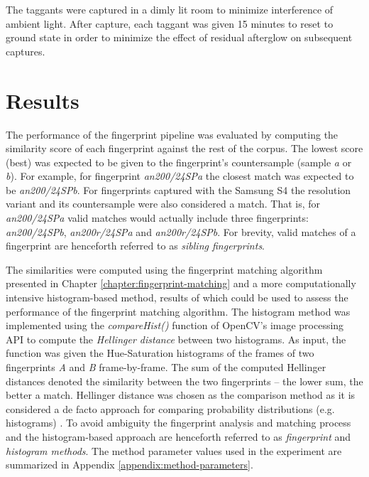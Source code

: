 \documentclass[thesis.tex]{subfiles}
\begin{document}
The taggants were captured in a dimly lit room to minimize interference of ambient light. After capture, each taggant was given 15 minutes to reset to ground state in order to minimize the effect of residual afterglow on subsequent captures.

\section{Results}
\label{chapter:results}

The performance of the fingerprint pipeline was evaluated by computing the similarity score of each fingerprint against the rest of the corpus. The lowest score (best) was expected to be given to the fingerprint's countersample (sample \emph{a} or \emph{b}). For example, for fingerprint \emph{an200/24SPa} the closest match was expected to be \emph{an200/24SPb}. For fingerprints captured with the Samsung S4 the resolution variant and its countersample were also considered a match. That is, for \emph{an200/24SPa} valid matches would actually include three fingerprints: \emph{an200/24SPb}, \emph{an200r/24SPa} and \emph{an200r/24SPb}. For brevity, valid matches of a fingerprint are henceforth referred to as \emph{sibling fingerprints}.

The similarities were computed using the fingerprint matching algorithm presented in Chapter \ref{chapter:fingerprint-matching} and a more computationally intensive histogram-based method, results of which could be used to assess the performance of the fingerprint matching algorithm. The histogram method was implemented using the \emph{compareHist()} function of OpenCV's image processing API to compute the \emph{Hellinger distance} between two histograms. As input, the function was given the Hue-Saturation histograms of the frames of two fingerprints \emph{A} and \emph{B} frame-by-frame. The sum of the computed Hellinger distances denoted the similarity between the two fingerprints -- the lower sum, the better a match. Hellinger distance was chosen as the comparison method as it is considered a de facto approach for comparing probability distributions (e.g. histograms) \cite{hellinger}. To avoid ambiguity the fingerprint analysis and matching process and the histogram-based approach are henceforth referred to as \emph{fingerprint} and \emph{histogram methods}. The method parameter values used in the experiment are summarized in Appendix \ref{appendix:method-parameters}.
\end{document}
